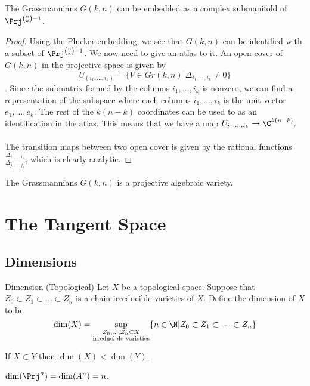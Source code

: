 \documentclass[a4paper]{article}
\begin{document}
\begin{thm}{}{} The Grassmannians $G(k,n)$ can be embedded as a complex submanifold of $\Prj^{\binom{n}{k}-1}$. \tcbline
\begin{proof}
Using the Plucker embedding, we see that $G(k,n)$ can be identified with a subset of $\Prj^{\binom{n}{k}-1}$. We now need to give an atlas to it. An open cover of $G(k,n)$ in the projective space is given by $$U_{(i_1,\dots,i_k)}=\{V\in Gr(k,n)|\Delta_{i_1,\dots,i_k}\neq 0\}$$. Since the submatrix formed by the columns $i_1,\dots,i_k$ is nonzero, we can find a representation of the subspace where each columns $i_1,\dots,i_k$ is the unit vector $e_1,\dots,e_k$. The rest of the $k(n-k)$ coordinates can be used to as an identification in the atlas. This means that we have a map $U_{i_1,\dots,i_k}\to\C^{k(n-k)}$. \\~\\
The transition maps between two open cover is given by the rational functions $\frac{\Delta_{i_1,\dots,i_k}}{\Delta_{j_1,\dots,j_k}}$, which is clearly analytic. 
\end{proof}
\end{thm}

\begin{thm}{}{} The Grassmannians $G(k,n)$ is a projective algebraic variety. 
\end{thm}

\pagebreak
\section{The Tangent Space}
\subsection{Dimensions}
\begin{defn}{Dimension (Topological)}{} Let $X$ be a topological space. Suppose that $Z_0\subset Z_1\subset\dots\subset Z_n$ is a chain irreducible varieties of $X$. Define the dimension of $X$ to be $$\dim(X)=\sup_{\substack{Z_0,\dots,Z_n\subseteq X\\\text{irreducible varieties}}}\{n\in\N|Z_0\subset Z_1\subset\dots\subset Z_n\}$$
\end{defn}

\begin{lmm}{}{} If $X\subset Y$ then $\dim(X)<\dim(Y)$. 
\end{lmm}

\begin{lmm}{}{} $\dim(\Prj^n)=\dim(A^n)=n$. 
\end{lmm}
\end{document}
